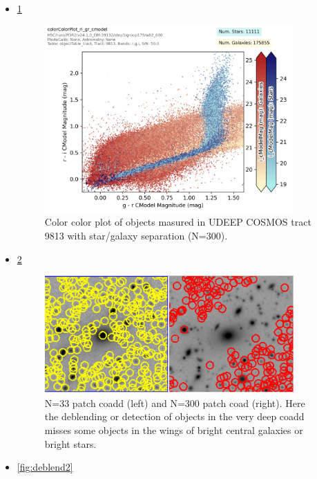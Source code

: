 \begin{itemize}
\item \ref{fig:colorcolor}

 \begin{figure}[h]
 \includegraphics[width=0.9\textwidth]{colorColor9813.png}
	 \caption{Color color plot of objects masured in UDEEP COSMOS tract 9813 with star/galaxy separation (N=300).  \label{fig:colorcolor}}
 \end{figure}

\item \ref{fig:deblend1}

 \begin{figure}[h]
 \includegraphics[width=0.9\textwidth]{wobjects.png}
	 \caption{N=33 patch coadd (left) and N=300 patch coad (right).  Here the deblending or detection of objects in the very deep coadd misses some objects in the wings of bright central galaxies or bright stars.  \label{fig:deblend1}}
 \end{figure}

\item \ref{fig:deblend2}


\end{itemize}
